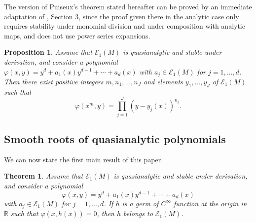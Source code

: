 \documentclass[a4paper]{amsart}
\theoremstyle{plain}
\newtheorem{thm}{Theorem}
\newtheorem{prop}{Proposition}
\theoremstyle{remark}
\begin{document}
The version of Puiseux's theorem stated hereafter can be proved by an immediate adaptation of  \cite{BM}, Section 3, since the proof given there in the analytic case only requires stability under monomial division and under composition with analytic maps, and does not use power series expansions.

\begin{prop}\label{Puiseux} 
Assume that $ \mathcal{E}_1(M) $ is quasianalytic and stable under derivation, and consider a polynomial 
$\varphi(x,y)=y^d+a_1(x)y^{d-1}+\cdots+a_d(x)$
with $ a_j\in\mathcal{E}_1(M) $ for $ j=1,\ldots,d $.
Then there exist positive integers $ m, n_1,\ldots,n_J $ and elements $ y_1,\ldots,y_J $ of $ \mathcal{E}_1(M) $ such that 
\begin{equation}\label{puiform}
\varphi(x^m,y)=\prod_{j=1}^J(y-y_j(x))^{n_j}.
\end{equation}
\end{prop}

\subsection{Smooth roots of quasianalytic polynomials}

We can now state the first main result of this paper.

\begin{thm}\label{main} Assume that $ \mathcal{E}_1(M) $ is quasianalytic and stable under derivation, and
consider a polynomial 
\begin{equation*}
\varphi(x,y)=y^d+a_1(x)y^{d-1}+\cdots+a_d(x)
\end{equation*}
with $ a_j\in\mathcal{E}_1(M) $ for $ j=1,\ldots,d $. If $ h $ is a germ of $ C^\infty $ function at the origin in $ \mathbb{R} $ such that $ \varphi(x,h(x))=0 $, then $ h $ belongs to $ \mathcal{E}_1(M) $.
\end{thm}
\end{document}
